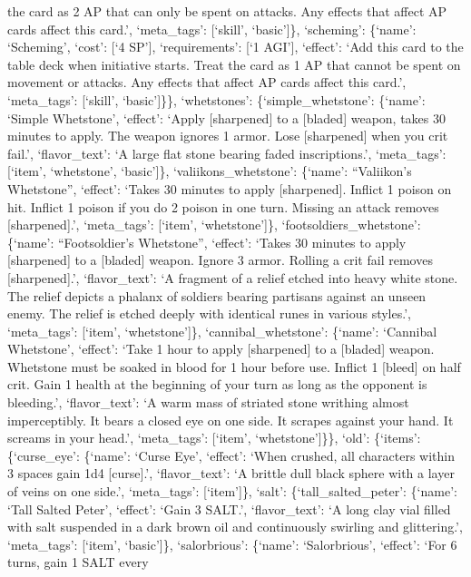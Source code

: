\documentclass[
  letterpaper,
  DIV=11,
  numbers=noendperiod]{scrartcl}
\begin{document}
the card as 2 AP that can only be spent on attacks. Any effects that
affect AP cards affect this card.', `meta\_tags': {[}`skill',
`basic'{]}\}, `scheming': \{`name': `Scheming', `cost': {[}`4 SP'{]},
`requirements': {[}`1 AGI'{]}, `effect': `Add this card to the table
deck when initiative starts. Treat the card as 1 AP that cannot be spent
on movement or attacks. Any effects that affect AP cards affect this
card.', `meta\_tags': {[}`skill', `basic'{]}\}\}, `whetstones':
\{`simple\_whetstone': \{`name': `Simple Whetstone', `effect': `Apply
{[}sharpened{]} to a {[}bladed{]} weapon, takes 30 minutes to apply. The
weapon ignores 1 armor. Lose {[}sharpened{]} when you crit fail.',
`flavor\_text': `A large flat stone bearing faded inscriptions.',
`meta\_tags': {[}`item', `whetstone', `basic'{]}\},
`valiikons\_whetstone': \{`name': ``Valiikon's Whetstone'', `effect':
`Takes 30 minutes to apply {[}sharpened{]}. Inflict 1 poison on hit.
Inflict 1 poison if you do 2 poison in one turn. Missing an attack
removes {[}sharpened{]}.', `meta\_tags': {[}`item', `whetstone'{]}\},
`footsoldiers\_whetstone': \{`name': ``Footsoldier's Whetstone'',
`effect': `Takes 30 minutes to apply {[}sharpened{]} to a {[}bladed{]}
weapon. Ignore 3 armor. Rolling a crit fail removes {[}sharpened{]}.',
`flavor\_text': `A fragment of a relief etched into heavy white stone.
The relief depicts a phalanx of soldiers bearing partisans against an
unseen enemy. The relief is etched deeply with identical runes in
various styles.', `meta\_tags': {[}`item', `whetstone'{]}\},
`cannibal\_whetstone': \{`name': `Cannibal Whetstone', `effect': `Take 1
hour to apply {[}sharpened{]} to a {[}bladed{]} weapon. Whetstone must
be soaked in blood for 1 hour before use. Inflict 1 {[}bleed{]} on half
crit. Gain 1 health at the beginning of your turn as long as the
opponent is bleeding.', `flavor\_text': `A warm mass of striated stone
writhing almost imperceptibly. It bears a closed eye on one side. It
scrapes against your hand. It screams in your head.', `meta\_tags':
{[}`item', `whetstone'{]}\}\}, `old': \{`items': \{`curse\_eye':
\{`name': `Curse Eye', `effect': `When crushed, all characters within 3
spaces gain 1d4 {[}curse{]}.', `flavor\_text': `A brittle dull black
sphere with a layer of veins on one side.', `meta\_tags':
{[}`item'{]}\}, `salt': \{`tall\_salted\_peter': \{`name': `Tall Salted
Peter', `effect': `Gain 3 SALT.', `flavor\_text': `A long clay vial
filled with salt suspended in a dark brown oil and continuously swirling
and glittering.', `meta\_tags': {[}`item', `basic'{]}\}, `salorbrious':
\{`name': `Salorbrious', `effect': `For 6 turns, gain 1 SALT every
\end{document}
